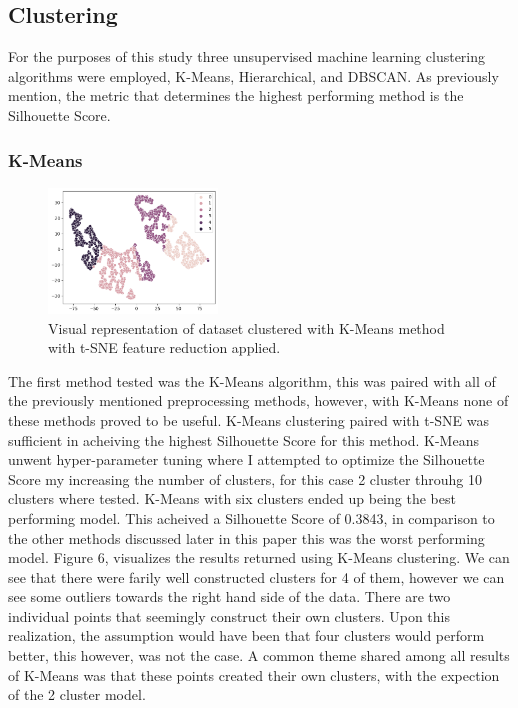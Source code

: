 \documentclass[twocolumn]{article}
\begin{document}
\subsection{Clustering}

For the purposes of this study three unsupervised machine learning clustering algorithms were employed, K-Means, Hierarchical, and DBSCAN. As previously mention, the metric that determines the highest performing method is the Silhouette Score. 

\subsubsection{K-Means}

\begin{figure}[H]
    \centering
    \includegraphics[width=0.4\textwidth]{images/kmeans.png}
    \caption{Visual representation of dataset clustered with K-Means method with t-SNE feature reduction applied.}
\end{figure}

The first method tested was the K-Means algorithm, this was paired with all of the previously mentioned preprocessing methods, however, with K-Means none of these methods proved to be useful. K-Means clustering paired with t-SNE was sufficient in acheiving the highest Silhouette Score for this method. K-Means unwent hyper-parameter tuning where I attempted to optimize the Silhouette Score my increasing the number of clusters, for this case 2 cluster throuhg 10 clusters where tested. K-Means with six clusters ended up being the best performing model. This acheived a Silhouette Score of 0.3843, in comparison to the other methods discussed later in this paper this was the worst performing model. Figure 6, visualizes the results returned using K-Means clustering. We can see that there were farily well constructed clusters for 4 of them, however we can see some outliers towards the right hand side of the data. There are two individual points that seemingly construct their own clusters. Upon this realization, the assumption would have been that four clusters would perform better, this however, was not the case. A common theme shared among all results of K-Means was that these points created their own clusters, with the expection of the 2 cluster model.
\end{document}
